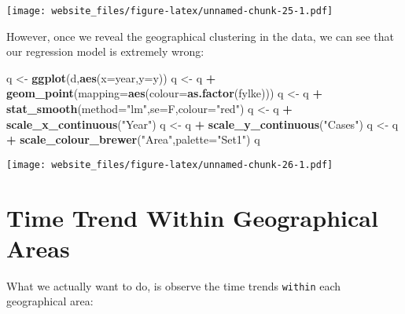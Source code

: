 \documentclass[]{book}
\newenvironment{Shaded}{\begin{snugshade}}{\end{snugshade}}
\newcommand{\KeywordTok}[1]{\textcolor[rgb]{0.13,0.29,0.53}{\textbf{#1}}}
\newcommand{\DataTypeTok}[1]{\textcolor[rgb]{0.13,0.29,0.53}{#1}}
\newcommand{\StringTok}[1]{\textcolor[rgb]{0.31,0.60,0.02}{#1}}
\newcommand{\OperatorTok}[1]{\textcolor[rgb]{0.81,0.36,0.00}{\textbf{#1}}}
\newcommand{\NormalTok}[1]{#1}
\begin{document}
\texttt{[image: website\_files/figure-latex/unnamed-chunk-25-1.pdf]}

However, once we reveal the geographical clustering in the data, we can
see that our regression model is extremely wrong:

\begin{Shaded}
\begin{Highlighting}[]
\NormalTok{q <-}\StringTok{ }\KeywordTok{ggplot}\NormalTok{(d,}\KeywordTok{aes}\NormalTok{(}\DataTypeTok{x=}\NormalTok{year,}\DataTypeTok{y=}\NormalTok{y))}
\NormalTok{q <-}\StringTok{ }\NormalTok{q }\OperatorTok{+}\StringTok{ }\KeywordTok{geom_point}\NormalTok{(}\DataTypeTok{mapping=}\KeywordTok{aes}\NormalTok{(}\DataTypeTok{colour=}\KeywordTok{as.factor}\NormalTok{(fylke)))}
\NormalTok{q <-}\StringTok{ }\NormalTok{q }\OperatorTok{+}\StringTok{ }\KeywordTok{stat_smooth}\NormalTok{(}\DataTypeTok{method=}\StringTok{"lm"}\NormalTok{,}\DataTypeTok{se=}\NormalTok{F,}\DataTypeTok{colour=}\StringTok{"red"}\NormalTok{)}
\NormalTok{q <-}\StringTok{ }\NormalTok{q }\OperatorTok{+}\StringTok{ }\KeywordTok{scale_x_continuous}\NormalTok{(}\StringTok{"Year"}\NormalTok{)}
\NormalTok{q <-}\StringTok{ }\NormalTok{q }\OperatorTok{+}\StringTok{ }\KeywordTok{scale_y_continuous}\NormalTok{(}\StringTok{"Cases"}\NormalTok{)}
\NormalTok{q <-}\StringTok{ }\NormalTok{q }\OperatorTok{+}\StringTok{ }\KeywordTok{scale_colour_brewer}\NormalTok{(}\StringTok{"Area"}\NormalTok{,}\DataTypeTok{palette=}\StringTok{"Set1"}\NormalTok{)}
\NormalTok{q}
\end{Highlighting}
\end{Shaded}

\texttt{[image: website\_files/figure-latex/unnamed-chunk-26-1.pdf]}

\section{Time Trend Within Geographical
Areas}\label{time-trend-within-geographical-areas}

What we actually want to do, is observe the time trends \texttt{within}
each geographical area:
\end{document}
